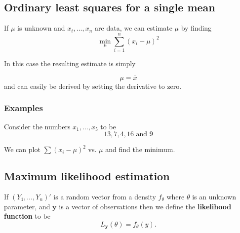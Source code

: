 \documentclass[12pt,a4paper]{article}
\theoremstyle{regla}
\theoremstyle{remark}
\theoremstyle{definition}
\theoremstyle{nonumberbreak}
\begin{document}
\subsection{Ordinary least squares for a single mean}
\begin{fbox}
\begin{minipage}{0.97\textwidth}

If $\mu$ is unknown and $x_i,\ldots,x_n$ are data, we can estimate $\mu$ by finding
$$
\min_{\mu} \sum_{i=1}^{n}(x_i-\mu)^2
$$

In this case the resulting estimate is simply

$$
\mu = \overline{x}
$$
and can easily be derived by setting the derivative to zero.
\end{minipage}
\end{fbox}
\subsubsection{Examples}
\begin{xmpl} 

Consider the numbers $x_1, \ldots, x_5$ to be
$$
13,7,4,16 \textrm{ and } 9
$$

We can plot $\sum(x_i-\mu)^2$ vs. $\mu$ and find the minimum.
\end{xmpl}

\subsection{Maximum likelihood estimation}
\begin{fbox}
\begin{minipage}{0.97\textwidth}
If $\left (Y_1, \ldots , Y_n\right )'$ is a random vector from a density $f_{\theta}$ where $\theta$ is an unknown parameter, and $\mathbf{y}$ is a vector of observations then we define the \textbf{likelihood function} to be
$$
L_{\mathbf{y}}(\theta)=f_{\theta}(y).
$$

\end{minipage}
\end{fbox}
\end{document}
